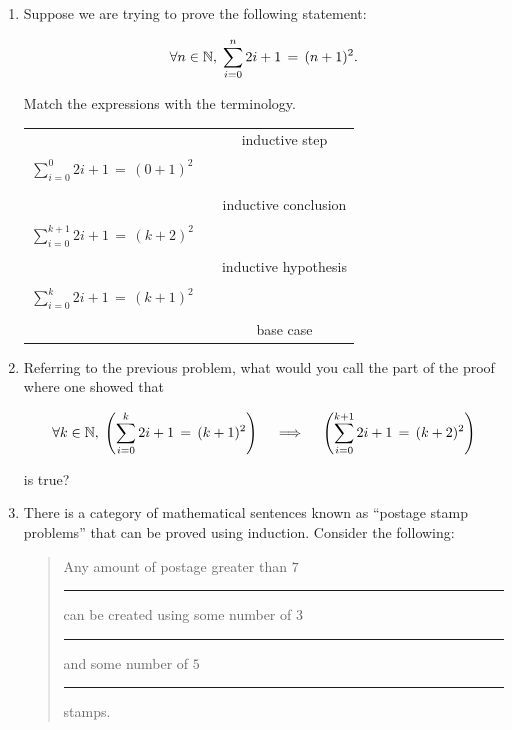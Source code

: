 \documentclass{amsart}
\begin{document}
\begin{enumerate}

\item Suppose we are trying to prove the following statement:

\[ \forall n \in {\mathbb N}, \; \sum_{i=0}^n 2i+1 \, = \, (n+1)^2. \]

\vfill

\newpage

Match the expressions with the terminology.

\begin{tabular}{ccc} 
 &  & inductive step \\ 
$\displaystyle \sum_{i=0}^0 2i+1 \, = \, (0+1)^2$ & \rule{1.5 in}{0pt} &  \\
\rule{0pt}{12pt} & & \\
 & & inductive conclusion \\
\rule{0pt}{12pt} & & \\
$ \displaystyle  \sum_{i=0}^{k+1} 2i+1 \, = \, (k+2)^2 $ & & \\
\rule{0pt}{12pt} & & \\
 & & inductive hypothesis \\
\rule{0pt}{12pt} & & \\
$ \displaystyle  \sum_{i=0}^k 2i+1 \, = \, (k+1)^2 $ & & \\
\rule{0pt}{12pt} & & \\
 & & base case \\
\end{tabular}

\vfill

\item Referring to the previous problem, what would you call the part of the proof where one showed that

\[ \displaystyle \forall k \in {\mathbb N}, \; \left( \sum_{i=0}^k 2i+1 \, = \, (k+1)^2 \right) \quad \implies \quad \left( \sum_{i=0}^{k+1} 2i+1 \, = \, (k+2)^2 \right) \]

\noindent is true?

\vfill

\newpage

\item There is a category of mathematical sentences known as ``postage stamp problems'' that can be proved using induction.  Consider the following:

\begin{quote} Any amount of postage greater than $7$\textcent \rule{2pt}{0pt} can be created using some number of $3$\textcent \rule{2pt}{0pt} and some number of $5$\textcent  \rule{2pt}{0pt} stamps.
\end{quote}
\medskip


\end{enumerate}
\end{document}
